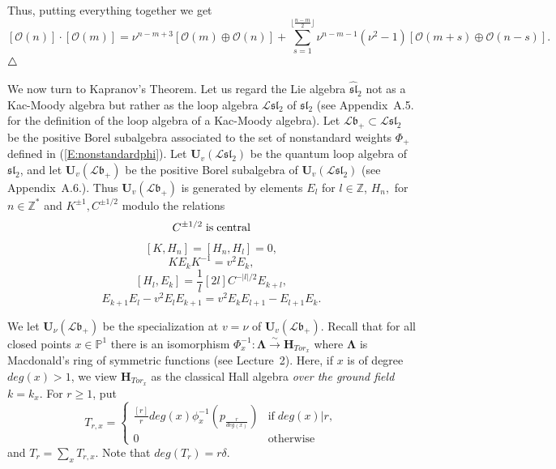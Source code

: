 \documentclass[a4paper,10pt]{amsart}
\def\Z{\mathbb{Z}}
\def\H{\mathbf{H}}
\def\U{\mathbf{U}}
\def\endexample{$\hfill \triangle$}
\def\O{\mathcal{O}}
\def\bo{\mathfrak{b}}
\def\LLambda{\boldsymbol{\Lambda}}
\numberwithin{equation}{section}
\begin{document}
\vspace{.05in}

Thus, putting everything together we get
\begin{equation}\label{E:prodoo}
[\O(n)]\cdot[\O(m)]=\nu^{n-m+3}[\O(m) \oplus \O(n)] + \sum_{s=1}^{\lfloor \frac{n-m}{2}\rfloor}\nu^{n-m-1}(\nu^2-1)[\O(m+s) \oplus \O(n-s)].
\end{equation}
\endexample

\vspace{.2in}

We now turn to Kapranov's Theorem. Let us regard the Lie algebra $\widehat{\mathfrak{sl}}_2$ not as a Kac-Moody algebra but rather as the loop algebra $\mathcal{L}\mathfrak{sl}_2$ of $\mathfrak{sl}_2$ (see Appendix~A.5. for the definition of the loop algebra of a Kac-Moody algebra). Let $\mathcal{L}\bo_+ \subset \mathcal{L}\mathfrak{sl}_2$ be the positive Borel subalgebra associated to the set of nonstandard weights $\Phi_+$ defined in (\ref{E:nonstandardphi}).
Let $\U_v(\mathcal{L}{\mathfrak{sl}}_2)$ be the quantum loop algebra of  ${\mathfrak{sl}}_2$, and let
$\U_v(\mathcal{L}\bo_+)$ be the positive Borel subalgebra of $\U_v(\mathcal{L}\mathfrak{sl}_2)$
(see Appendix~A.6.). Thus $\U_v(\mathcal{L}\bo_+)$ is generated by elements $E_l$ for $l \in \Z$, $H_n,$ for $n \in \Z^*$ and $K^{\pm 1}, C^{\pm 1/2}$ modulo the relations
\begin{equation}\label{E:Eee1}
C^{\pm 1/2} \;\text{is\;central}
\end{equation}
\begin{equation}\label{E:Eee2}
[K,H_{n}]=[H_n,H_l]=0,
\end{equation}
\begin{equation}\label{E:Eee3}
K E_{k}K^{-1}=v^{2}E_{k},
\end{equation}
\begin{equation}\label{E:Eee4}
[H_{l},E_{k}]= \frac{1}{l}[2l]C^{-|l|/2}E_{k+l},
\end{equation}
\begin{equation}\label{E:Eee5}
E_{k+1}E_{l}-v^{2}E_{l}E_{k+1}=
v^{2}E_{k}E_{l+1}-E_{l+1}E_{k}.
\end{equation}

\vspace{.15in}

 We let $\U_{\nu}(\mathcal{L}\bo_+)$ be the specialization at $v=\nu$ of $\U_v(\mathcal{L}\bo_+)$. Recall that for all closed points $x \in \mathbb{P}^1$ there is an isomorphism $\Phi_x^{-1}: \LLambda \stackrel{\sim}{\to} \H_{Tor_x}$ where $\LLambda$ is Macdonald's ring of symmetric functions (see Lecture~2). Here, if $x$ is of degree $deg(x)>1$, we view $\H_{Tor_x}$ as the classical Hall algebra \textit{over the ground field} $k=k_x$.
For $r \geq 1$, put
$$T_{r,x}=\begin{cases} \frac{[r]}{r}deg(x) \phi_x^{-1}(p_{\frac{r}{deg(x)}})& \text{if}\; deg(x) | r,\\
0& \text{otherwise}\end{cases}$$
and $T_r=\sum_x T_{r,x}$. Note that $deg(T_r)=r\delta$.
\end{document}
